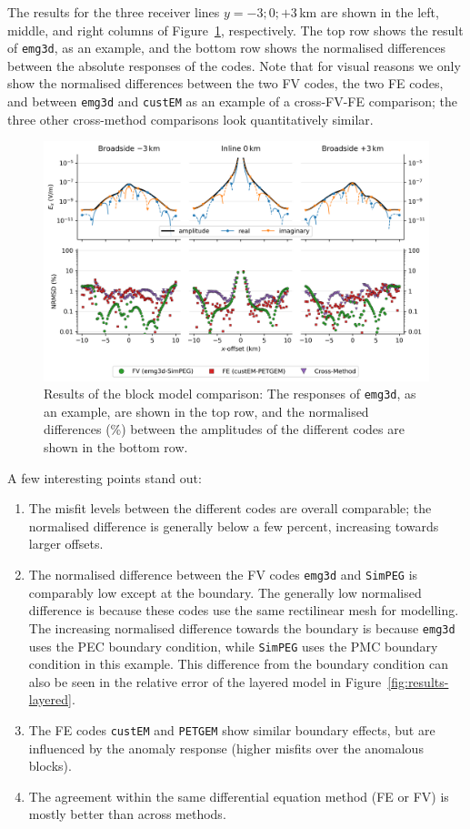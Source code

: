 \documentclass[extra, camera,%
]{gji}
\newlength{\fwidth}
\newcommand{\emg}[2]{\texttt{emg#1#2}\xspace}
\newcommand{\simpeg}{\texttt{SimPEG}\xspace}
\newcommand{\custem}{\texttt{custEM}\xspace}
\newcommand{\petgem}{\texttt{PETGEM}\xspace}
\begin{document}
The results for the three receiver lines $y=-3;0;+3\,$km are shown in the left, middle, and right columns of Figure~\ref{fig:results-block}, respectively. The top row shows the result of \emg3d, as an example, and the bottom row shows the normalised differences between the absolute responses of the codes. Note that for visual reasons we only show the normalised differences between the two FV codes, the two FE codes, and between \emg3d and \custem as an example of a cross-FV-FE comparison; the three other cross-method comparisons look quantitatively similar.
%
\begin{figure}
  \centering
  \includegraphics[width=.9\fwidth]{figures/results-block.png}
  \caption{Results of the block model comparison: The responses of \emg3d, as an example, are shown in the top row, and the normalised differences (\%) between the amplitudes of the different codes are shown in the bottom row.}
  \label{fig:results-block}
\end{figure}
%

A few interesting points stand out:
\begin{enumerate}
  \item The misfit levels between the different codes are overall comparable; the normalised difference is generally below a few percent, increasing towards larger offsets.
  \item The normalised difference between the FV codes \emg3d and \simpeg is comparably low except at the boundary. The generally low normalised difference is because these codes use the same rectilinear mesh for modelling. The increasing normalised difference towards the boundary is because \emg3d uses the PEC boundary condition, while \simpeg uses the PMC boundary condition in this example. This difference from the boundary condition can also be seen in the relative error of the layered model in Figure~\ref{fig:results-layered}.
  \item The FE codes \custem and \petgem show similar boundary effects, but are influenced by the anomaly response (higher misfits over the anomalous blocks).
  \item The agreement within the same differential equation method (FE or FV) is mostly better than across methods.
\end{enumerate}
\end{document}
